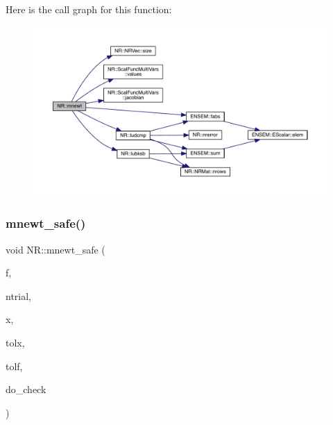 Here is the call graph for this function\+:
\nopagebreak
\begin{figure}[H]
\begin{center}
\leavevmode
\includegraphics[width=350pt]{da/d46/namespaceNR_a9217e3777ed00b4cd6f83abd69e4cef9_cgraph}
\end{center}
\end{figure}
\mbox{\label{namespaceNR_a613c01d6d0517310d92cab226cef58bc}} 
\subsubsection{\texorpdfstring{mnewt\_safe()}{mnewt\_safe()}}
{\footnotesize\ttfamily void N\+R\+::mnewt\+\_\+safe (\begin{DoxyParamCaption}\item[{const \mbox{\hyperlink{classNR_1_1ScalFuncMultiVars}{Scal\+Func\+Multi\+Vars}} \&}]{f,  }\item[{const int}]{ntrial,  }\item[{\mbox{\hyperlink{namespaceNR_ab293e06a6bf799d8a7ed932b6852bcb8}{Vec\+\_\+\+I\+O\+\_\+\+DP}} \&}]{x,  }\item[{const \mbox{\hyperlink{namespaceNR_af6ff762dd605ff477b8e52387253a02a}{DP}}}]{tolx,  }\item[{const \mbox{\hyperlink{namespaceNR_af6ff762dd605ff477b8e52387253a02a}{DP}}}]{tolf,  }\item[{const bool}]{do\+\_\+check }\end{DoxyParamCaption})}

